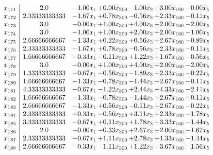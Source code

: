 \documentclass[8pt]{article}
\begin{document}
\[\begin{array}{c| c c@{\hskip 2pt} c@{\hskip 2pt} c@{\hskip 2pt} c@{\hskip 2pt} c@{\hskip 2pt} }
 x_{171}   &  2.0 & -1.00 x_{1} & +  0.00 x_{309} & -1.00 x_{3} & +  3.00 x_{160} & -0.00 x_{5}\\
 x_{172}   &  2.33333333333 & -1.67 x_{1} & +  0.78 x_{309} & -0.56 x_{3} & +  2.33 x_{160} & -0.11 x_{5}\\
 x_{173}   &  3.0 & -0.00 x_{1} & +  1.00 x_{309} & +  4.00 x_{3} & +  2.00 x_{160} & -2.00 x_{5}\\
 x_{174}   &  3.0 & -1.00 x_{1} & +  1.00 x_{309} & +  2.00 x_{3} & +  2.00 x_{160} & -1.00 x_{5}\\
 x_{175}   &  2.66666666667 & -1.33 x_{1} & +  0.22 x_{309} & +  0.56 x_{3} & +  2.67 x_{160} & -0.89 x_{5}\\
 x_{176}   &  2.33333333333 & -1.67 x_{1} & +  0.78 x_{309} & -0.56 x_{3} & +  2.33 x_{160} & -0.11 x_{5}\\
 x_{177}   &  1.66666666667 & -0.33 x_{1} & -0.11 x_{309} & +  1.22 x_{3} & +  1.67 x_{160} & -0.56 x_{5}\\
 x_{178}   &  3.0 & -0.00 x_{1} & +  1.00 x_{309} & +  4.00 x_{3} & +  2.00 x_{160} & -2.00 x_{5}\\
 x_{179}   &  1.33333333333 & -0.67 x_{1} & -0.56 x_{309} & -1.89 x_{3} & +  2.33 x_{160} & +  0.22 x_{5}\\
 x_{180}   &  1.66666666667 & -1.33 x_{1} & -0.78 x_{309} & -1.44 x_{3} & +  2.67 x_{160} & +  0.11 x_{5}\\
 x_{181}   &  4.33333333333 & -0.67 x_{1} & -1.22 x_{309} & +  2.44 x_{3} & +  4.33 x_{160} & -2.11 x_{5}\\
 x_{182}   &  1.66666666667 & -1.33 x_{1} & -0.78 x_{309} & -1.44 x_{3} & +  2.67 x_{160} & +  0.11 x_{5}\\
 x_{183}   &  2.66666666667 & -1.33 x_{1} & +  0.56 x_{309} & -0.11 x_{3} & +  2.67 x_{160} & -0.22 x_{5}\\
 x_{184}   &  2.33333333333 & +  0.33 x_{1} & -0.56 x_{309} & +  3.11 x_{3} & +  2.33 x_{160} & -1.78 x_{5}\\
 x_{185}   &  3.33333333333 & -0.67 x_{1} & +  0.11 x_{309} & +  1.78 x_{3} & +  3.33 x_{160} & -1.44 x_{5}\\
 x_{186}   &  2.0 & -0.00 x_{1} & -0.33 x_{309} & +  2.67 x_{3} & +  2.00 x_{160} & -1.67 x_{5}\\
 x_{187}   &  2.33333333333 & -0.67 x_{1} & +  1.11 x_{309} & +  2.78 x_{3} & +  1.33 x_{160} & -1.44 x_{5}\\
 x_{188}   &  2.66666666667 & -0.33 x_{1} & -1.11 x_{309} & +  1.22 x_{3} & +  3.67 x_{160} & -1.56 x_{5}\\

\end{array}\]
\end{document}
